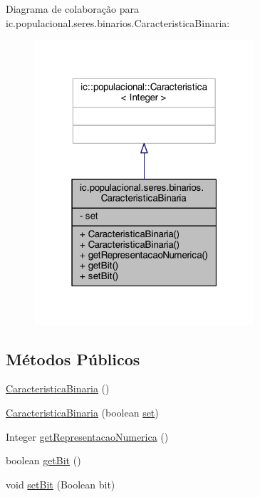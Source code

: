 Diagrama de colaboração para ic.\-populacional.\-seres.\-binarios.\-Caracteristica\-Binaria\-:
\nopagebreak
\begin{figure}[H]
\begin{center}
\leavevmode
\includegraphics[width=232pt]{classic_1_1populacional_1_1seres_1_1binarios_1_1_caracteristica_binaria__coll__graph}
\end{center}
\end{figure}
\subsection*{Métodos Públicos}
\begin{DoxyCompactItemize}
\item 
\hyperlink{classic_1_1populacional_1_1seres_1_1binarios_1_1_caracteristica_binaria_a56d2bb8f266a6e15df2b6c719ba3a02a}{Caracteristica\-Binaria} ()
\item 
\hyperlink{classic_1_1populacional_1_1seres_1_1binarios_1_1_caracteristica_binaria_a2ec5867b48fcfcdafb5f82fc01be6682}{Caracteristica\-Binaria} (boolean \hyperlink{classic_1_1populacional_1_1seres_1_1binarios_1_1_caracteristica_binaria_a681ee9eb0af3a4e8dfc2f5534602f558}{set})
\item 
Integer \hyperlink{classic_1_1populacional_1_1seres_1_1binarios_1_1_caracteristica_binaria_afc753198f1e3d4bda1b714c5e19498ee}{get\-Representacao\-Numerica} ()
\item 
boolean \hyperlink{classic_1_1populacional_1_1seres_1_1binarios_1_1_caracteristica_binaria_a7c5984e632a36604d8644cde332e266e}{get\-Bit} ()
\item 
void \hyperlink{classic_1_1populacional_1_1seres_1_1binarios_1_1_caracteristica_binaria_a67374a04aad7fc4cefe40dc3bdf83b1a}{set\-Bit} (Boolean bit)
\end{DoxyCompactItemize}
